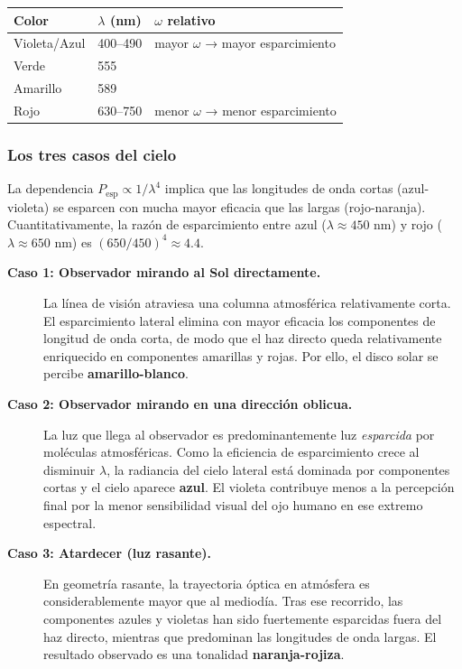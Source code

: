 \documentclass[12pt, a4paper]{article}
\theoremstyle{plain}
\theoremstyle{definition}
\theoremstyle{remark}
\begin{document}
\begin{center}
\begin{tabularx}{0.9\linewidth}{@{}L{2.8cm}L{2.4cm}Y@{}}
  \toprule
  Color & $\lambda$ (nm) & $\omega$ relativo \\
  \midrule
  Violeta/Azul & 400--490 & mayor $\omega$ → mayor esparcimiento \\
  Verde        & 555       &  \\
  Amarillo     & 589       &  \\
  Rojo         & 630--750 & menor $\omega$ → menor esparcimiento \\
  \bottomrule
\end{tabularx}
\end{center}

\subsubsection{Los tres casos del cielo}

La dependencia $P_\text{esp} \propto 1/\lambda^4$ implica que las longitudes de
onda cortas (azul-violeta) se esparcen con mucha mayor eficacia que las largas
(rojo-naranja). Cuantitativamente, la razón de esparcimiento entre azul
($\lambda\approx450$ nm) y rojo ($\lambda\approx650$ nm) es
$(650/450)^4 \approx 4.4$.

\begin{description}
  \item[\textbf{Caso 1: Observador mirando al Sol directamente.}]
        La línea de visión atraviesa una columna atmosférica relativamente
        corta. El esparcimiento lateral elimina con mayor eficacia los
        componentes de longitud de onda corta, de modo que el haz directo
        queda relativamente enriquecido en componentes amarillas y rojas.
        Por ello, el disco solar se percibe \textbf{amarillo-blanco}.

  \item[\textbf{Caso 2: Observador mirando en una dirección oblicua.}]
        La luz que llega al observador es predominantemente luz
        \emph{esparcida} por moléculas atmosféricas. Como la eficiencia de
        esparcimiento crece al disminuir $\lambda$, la radiancia del cielo
        lateral está dominada por componentes cortas y el cielo aparece
        \textbf{azul}. El violeta contribuye menos a la percepción final por la
        menor sensibilidad visual del ojo humano en ese extremo espectral.

  \item[\textbf{Caso 3: Atardecer (luz rasante).}]
        En geometría rasante, la trayectoria óptica en atmósfera es
        considerablemente mayor que al mediodía. Tras ese recorrido, las
        componentes azules y violetas han sido fuertemente esparcidas fuera del
        haz directo, mientras que predominan las longitudes de onda largas.
        El resultado observado es una tonalidad \textbf{naranja-rojiza}.
\end{description}
\end{document}
